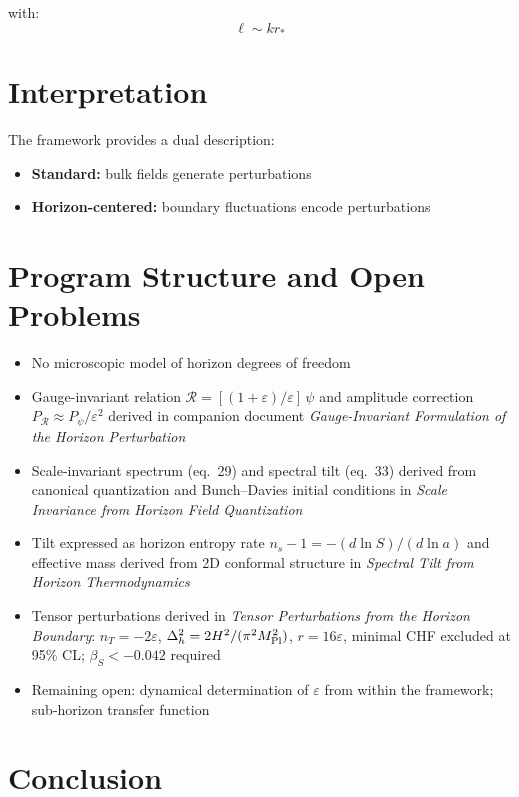 \documentclass[12pt,a4paper]{article}
\begin{document}
with:
\begin{equation}
\ell \sim kr_* \tag{35}
\end{equation}

\section{Interpretation}

The framework provides a dual description:

\begin{itemize}
  \item \textbf{Standard:} bulk fields generate perturbations
  \item \textbf{Horizon-centered:} boundary fluctuations encode perturbations
\end{itemize}

\section{Program Structure and Open Problems}

\begin{itemize}
  \item No microscopic model of horizon degrees of freedom
  \item Gauge-invariant relation $\mathcal{R} = [(1+\varepsilon)/\varepsilon]\,\psi$ and amplitude correction $P_\mathcal{R} \approx P_\psi/\varepsilon^2$ derived in companion document \textit{Gauge-Invariant Formulation of the Horizon Perturbation}
  \item Scale-invariant spectrum (eq.~29) and spectral tilt (eq.~33) derived from canonical quantization and Bunch--Davies initial conditions in \textit{Scale Invariance from Horizon Field Quantization}
  \item Tilt expressed as horizon entropy rate $n_s - 1 = -(d\ln S)/(d\ln a)$ and effective mass derived from 2D conformal structure in \textit{Spectral Tilt from Horizon Thermodynamics}
  \item Tensor perturbations derived in \textit{Tensor Perturbations from the Horizon Boundary}: $n_T = -2\varepsilon$, $\Delta_h^2 = 2H^2/(\pi^2 M_{\rm Pl}^2)$, $r = 16\varepsilon$, minimal CHF excluded at 95\% CL; $\beta_S < -0.042$ required
  \item Remaining open: dynamical determination of $\varepsilon$ from within the framework; sub-horizon transfer function
\end{itemize}

\section{Conclusion}
\end{document}
